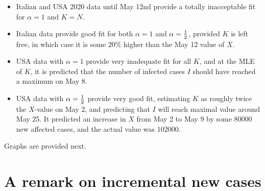 \documentclass{article}
\begin{document}
{\begin{itemize}

\item Italian and USA 2020 data until May 12nd provide a totally inacceptable fit for $\alpha=1$ and $K=N$.

\item Italian data provide good fit for both $\alpha=1$ and $\alpha={1 \over 2}$, provided $K$ is left free, in which case it is some $20\%$ higher than the May 12 value of $X$.

\item USA data with $\alpha=1$ provide very inadequate fit for all $K$, and at the MLE of $K$, it is predicted that the number of infected cases $I$ should have reached a maximum on May 8.

\item USA data with $\alpha={1 \over 2}$ provide very good fit, estimating $K$ as roughly twice the $X$-value on May 2, and predicting that $I$ will reach maximal value around May 25. It predicted an increase in $X$ from May 2 to May 9 by some $80000$ new affected cases, and the actual value was $102000$.

\end{itemize}

Graphs are provided next.

\section{A remark on incremental new cases} \label{More}

}
\end{document}
